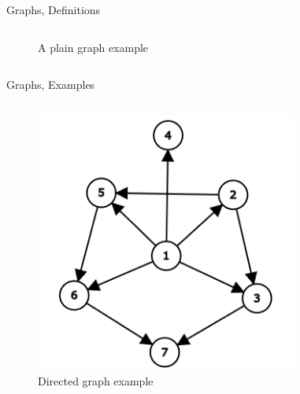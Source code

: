 \documentclass[aspectratio=169]{beamer}%
\begin{document}
\begin{frame}{Graphs, Definitions}
\begin{columns}[T]
\begin{column}{.30\textwidth}
\begin{figure}
                \caption{A plain graph example}%
            \end{figure}%
        \end{column}%
    \end{columns}%
\end{frame}%

\begin{frame}{Graphs, Examples}%
    \begin{columns}[T]%
        \begin{column}{.32\textwidth}%
            \begin{figure}%
                \centering%
                \includegraphics[width=.9\linewidth]{graph2.png}%
                \caption{Directed graph example}%
            \end{figure}%
        \end{column}%
        \hfill
        \begin{column}{.32\textwidth}%
            \begin{figure}%
                \centering%

\end{figure}
\end{column}
\end{columns}
\end{frame}
\end{document}

